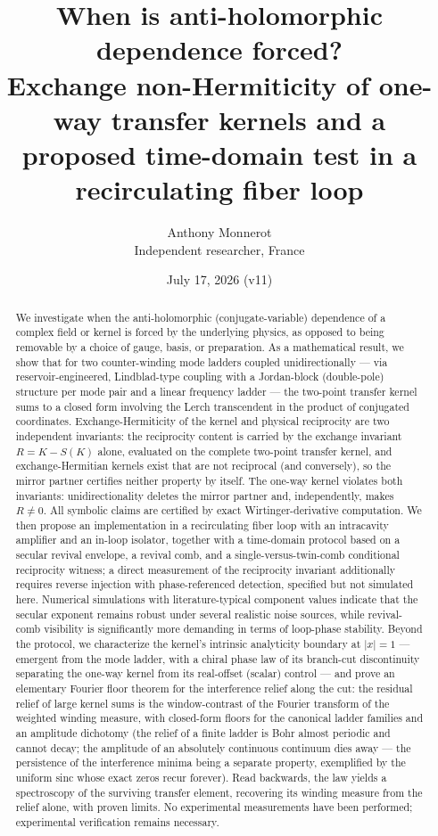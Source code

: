 \documentclass[11pt,a4paper]{article}
\title{\bfseries When is anti-holomorphic dependence forced?\\
Exchange non-Hermiticity of one-way transfer kernels and a proposed
time-domain test in a recirculating fiber loop}
\author{Anthony Monnerot\\ \small Independent researcher, France}
\date{July 17, 2026 (v11)}
\begin{document}
\maketitle

\begin{abstract}
\noindent
We investigate when the anti-holomorphic (conjugate-variable) dependence of a
complex field or kernel is forced by the underlying physics, as opposed to being
removable by a choice of gauge, basis, or preparation. As a mathematical result, we
show that for two counter-winding mode ladders coupled unidirectionally --- via
reservoir-engineered, Lindblad-type coupling with a Jordan-block (double-pole)
structure per mode pair and a linear frequency ladder --- the two-point transfer
kernel sums to a closed form involving the Lerch transcendent in the product of
conjugated coordinates. Exchange-Hermiticity of the kernel and physical reciprocity are two
independent invariants: the reciprocity content is carried by the exchange
invariant $R = K - S(K)$ alone, evaluated on the complete two-point transfer
kernel, and exchange-Hermitian kernels exist that are not reciprocal (and
conversely), so the mirror partner certifies neither property by itself. The
one-way kernel violates both invariants: unidirectionality deletes the mirror
partner and, independently, makes $R \neq 0$. All symbolic claims are certified by exact Wirtinger-derivative
computation. We then propose an implementation in a recirculating fiber loop with
an intracavity amplifier and an in-loop isolator, together with a time-domain
protocol based on a secular revival envelope, a revival comb, and a
single-versus-twin-comb conditional reciprocity witness; a direct
measurement of the reciprocity invariant additionally requires reverse
injection with phase-referenced detection, specified but not simulated
here. Numerical simulations with
literature-typical component values indicate that the secular exponent remains
robust under several realistic noise sources, while revival-comb visibility is
significantly more demanding in terms of loop-phase stability. Beyond the protocol, we characterize the kernel's intrinsic analyticity boundary at $|x| = 1$ --- emergent from the mode ladder, with a chiral phase law of its branch-cut discontinuity separating the one-way kernel from its real-offset (scalar) control --- and prove an elementary Fourier floor theorem for the interference relief along the cut: the residual relief of large kernel sums is the window-contrast of the Fourier transform of the weighted winding measure, with closed-form floors for the canonical ladder families and an amplitude dichotomy (the relief of a finite ladder is Bohr almost periodic and cannot decay; the amplitude of an absolutely continuous continuum dies away --- the persistence of the interference minima being a separate property, exemplified by the uniform sinc whose exact zeros recur forever). Read backwards, the law yields a spectroscopy of the surviving transfer element, recovering its winding measure from the relief alone, with proven limits. No experimental
measurements have been performed; experimental verification remains necessary.
\end{abstract}
\end{document}
